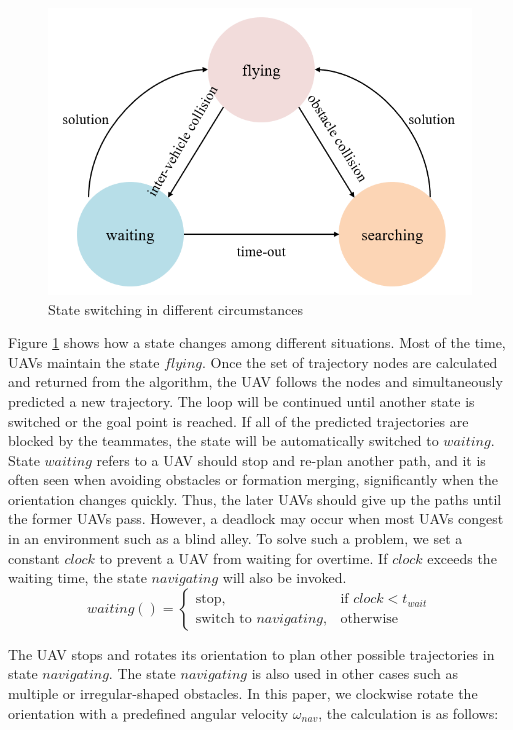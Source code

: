 \begin{figure}[H]
    \centering
    \includegraphics[scale=1]{figures/states.png}
    \caption{State switching in different circumstances}
    \label{fig:states}
\end{figure}

Figure \ref{fig:states} shows how a state changes among different situations. Most of the time, UAVs maintain the state $flying$. Once the set of trajectory nodes are calculated and returned from the algorithm, the UAV follows the nodes and simultaneously predicted a new trajectory. The loop will be continued until another state is switched or the goal point is reached. If all of the predicted trajectories are blocked by the teammates, the state will be automatically switched to $waiting$. State $waiting$ refers to a UAV should stop and re-plan another path, and it is often seen when avoiding obstacles or formation merging, significantly when the orientation changes quickly. Thus, the later UAVs should give up the paths until the former UAVs pass. However, a deadlock may occur when most UAVs congest in an environment such as a blind alley. To solve such a problem, we set a constant $clock$ to prevent a UAV from waiting for overtime. If $clock$ exceeds the waiting time, the state $navigating$ will also be invoked.
\[
    waiting()= 
\begin{cases}
    \text{stop},& \text{if } clock<t_{wait}\\
    \text{switch to } navigating, & \text{otherwise}
\end{cases}
\]

The UAV stops and rotates its orientation to plan other possible trajectories in state $navigating$. The state $navigating$ is also used in other cases such as multiple or irregular-shaped obstacles. In this paper, we clockwise rotate the orientation with a predefined angular velocity $\omega_{nav}$, the calculation is as follows:

